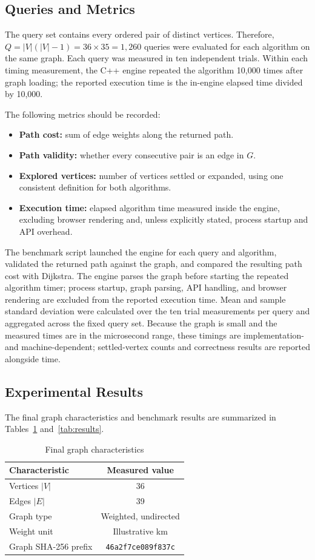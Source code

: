 \documentclass[conference]{IEEEtran}
\begin{document}
\subsection{Queries and Metrics}
The query set contains every ordered pair of distinct vertices. Therefore, $Q=|V|(|V|-1)=36\times35=1,260$ queries were evaluated for each algorithm on the same graph. Each query was measured in ten independent trials. Within each timing measurement, the C++ engine repeated the algorithm 10,000 times after graph loading; the reported execution time is the in-engine elapsed time divided by 10,000.

The following metrics should be recorded:
\begin{itemize}
    \item \textbf{Path cost:} sum of edge weights along the returned path.
    \item \textbf{Path validity:} whether every consecutive pair is an edge in $G$.
    \item \textbf{Explored vertices:} number of vertices settled or expanded, using one consistent definition for both algorithms.
    \item \textbf{Execution time:} elapsed algorithm time measured inside the engine, excluding browser rendering and, unless explicitly stated, process startup and API overhead.
\end{itemize}

The benchmark script launched the engine for each query and algorithm, validated the returned path against the graph, and compared the resulting path cost with Dijkstra. The engine parses the graph before starting the repeated algorithm timer; process startup, graph parsing, API handling, and browser rendering are excluded from the reported execution time. Mean and sample standard deviation were calculated over the ten trial measurements per query and aggregated across the fixed query set. Because the graph is small and the measured times are in the microsecond range, these timings are implementation- and machine-dependent; settled-vertex counts and correctness results are reported alongside time.

\subsection{Experimental Results}
The final graph characteristics and benchmark results are summarized in Tables~\ref{tab:graph} and~\ref{tab:results}.

\begin{table}[t]
\caption{Final graph characteristics}
\label{tab:graph}
\centering
\begin{tabular}{lc}
\toprule
Characteristic & Measured value\\
\midrule
Vertices $|V|$ & 36\\
Edges $|E|$ & 39\\
Graph type & Weighted, undirected\\
Weight unit & Illustrative km\\
Graph SHA-256 prefix & \texttt{46a2f7ce089f837c}\\
\bottomrule
\end{tabular}
\end{table}
\end{document}
